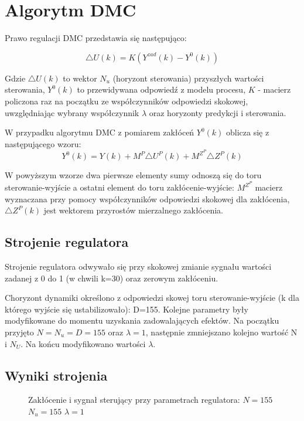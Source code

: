 \chapter{Algorytm DMC}

Prawo regulacji DMC przedstawia się następująco:

\begin{equation}
\triangle U(k)=K(Y^{zad}(k)-Y^0(k))
\end{equation}

Gdzie $\triangle U(k)$ to wektor $N_u$ (horyzont sterowania) przyszłych wartości sterowania, $Y^0(k)$ to przewidywana odpowiedź z modelu procesu, $K$ - macierz policzona raz na początku ze współczynników odpowiedzi skokowej, uwzględniając wybrany współczynnik $\lambda$ oraz horyzonty predykcji i sterowania.

W przypadku algorytmu DMC z pomiarem zakłóceń $Y^0(k)$ oblicza się z następującego wzoru:
\begin{equation}
Y^0(k)=Y(k)+M^P \triangle U^P(k)+M^{Z^P}\triangle Z^P(k)
\end{equation}

W powyższym wzorze dwa pierwsze elementy sumy odnoszą się do toru sterowanie-wyjście a ostatni element do toru zakłócenie-wyjście: $M^{Z^P}$ macierz wyznaczana przy pomocy współczynników odpowiedzi skokowej dla zakłócenia, $\triangle Z^P(k)$ jest wektorem przyrostów mierzalnego zakłócenia.


\section{Strojenie regulatora}
Strojenie regulatora odwywało się przy skokowej zmianie sygnału wartości zadanej z  0 do 1 (w chwili k=30) oraz zerowym zakłóceniu.

Choryzont dynamiki określono z odpowiedzi skowej toru sterowanie-wyjście (k dla którego wyjście się ustabilizowało): D=155.
Kolejne parametry były modyfikowane do momentu uzyskania zadowalających efektów. Na początku przyjęto $N=N_u=D=155$ oraz $\lambda=1$, następnie zmniejszano kolejno wartość N i $N_U$. Na końcu modyfikowano wartości $\lambda$.

\section{Wyniki strojenia}

\begin{figure}[H]
\centering

\caption{Zakłócenie i sygnał sterujący przy parametrach regulatora: $N=155$ $N_u=155$ $\lambda=1$}
\end{figure}

